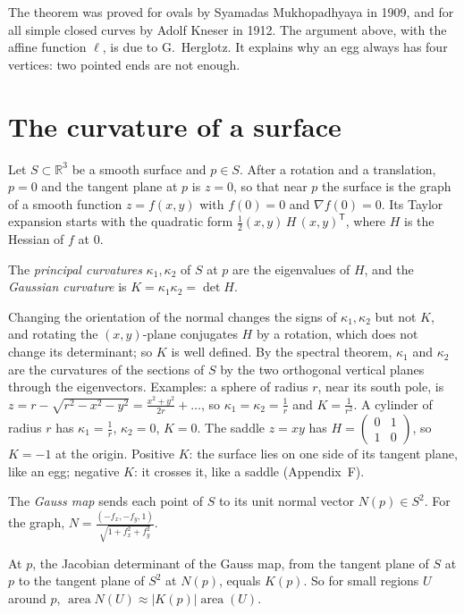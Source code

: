 The theorem was proved for ovals by Syamadas Mukhopadhyaya in 1909, and for all simple closed curves by Adolf Kneser in 1912. The argument above, with the
affine function $\ell$, is due to G.~Herglotz. It explains why an egg always has four vertices: two pointed ends are not enough.

\section{The curvature of a surface}

Let $S\subset\mathbb R^3$ be a smooth surface and $p\in S$. After a rotation and a translation, $p=0$ and the tangent plane at $p$ is $z=0$, so that near $p$ the
surface is the graph of a smooth function $z=f(x,y)$ with $f(0)=0$ and $\nabla f(0)=0$. Its Taylor expansion starts with the quadratic form
$\frac12(x,y)\,H\,(x,y)^{\mathsf T}$, where $H$ is the Hessian of $f$ at $0$.

\begin{definition}
The \emph{principal curvatures} $\kappa_1,\kappa_2$ of $S$ at $p$ are the eigenvalues of $H$, and the \emph{Gaussian curvature} is $K=\kappa_1\kappa_2=\det H$.
\end{definition}

Changing the orientation of the normal changes the signs of $\kappa_1,\kappa_2$ but not $K$, and rotating the $(x,y)$-plane conjugates $H$ by a rotation, which does not
change its determinant; so $K$ is well defined. By the spectral theorem, $\kappa_1$ and $\kappa_2$ are the curvatures of the sections of $S$ by the two orthogonal vertical
planes through the eigenvectors. Examples: a sphere of radius $r$, near its south pole, is $z=r-\sqrt{r^2-x^2-y^2}=\frac{x^2+y^2}{2r}+\dots$, so $\kappa_1=\kappa_2=\frac1r$
and $K=\frac1{r^2}$. A cylinder of radius $r$ has $\kappa_1=\frac1r$, $\kappa_2=0$, $K=0$. The saddle $z=xy$ has $H=\begin{pmatrix}0&1\\1&0\end{pmatrix}$, so $K=-1$ at
the origin. Positive $K$: the surface lies on one side of its tangent plane, like an egg; negative $K$: it crosses it, like a saddle (Appendix~F).

The \emph{Gauss map} sends each point of $S$ to its unit normal vector $N(p)\in S^2$. For the graph,
$N=\frac{(-f_x,-f_y,1)}{\sqrt{1+f_x^2+f_y^2}}$.

\begin{proposition}\label{geometry:prop:gaussmap}
At $p$, the Jacobian determinant of the Gauss map, from the tangent plane of $S$ at $p$ to the tangent plane of $S^2$ at $N(p)$, equals $K(p)$. So for small regions
$U$ around $p$, $\operatorname{area}N(U)\approx|K(p)|\operatorname{area}(U)$.
\end{proposition}

